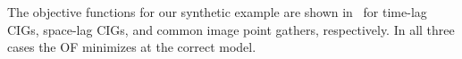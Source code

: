 The objective functions for our synthetic example are shown in~ for time-lag CIGs, space-lag CIGs, and
common image point gathers, respectively. In all three cases the OF minimizes at the correct model. 



